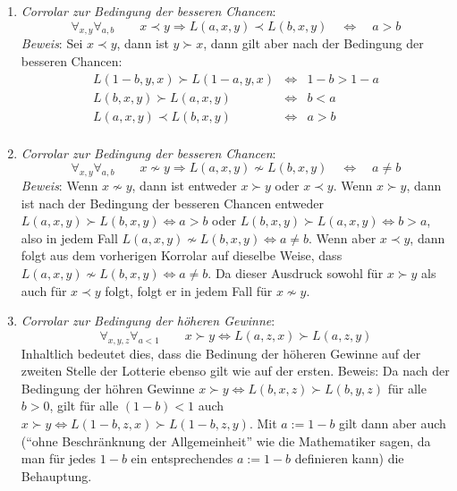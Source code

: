 \begin{enumerate}
  \item {\em Corrolar zur Bedingung der besseren Chancen}: 
  \[\forall_{x,y}\forall_{a,b} \qquad x \prec y \Rightarrow 
    L(a,x,y) \prec L(b,x,y) \quad \Leftrightarrow \quad a > b
  \]
  {\em Beweis}: Sei $x \prec y$, dann ist $y \succ x$, dann gilt aber nach der
  Bedingung der besseren Chancen:
  \begin{eqnarray*}
  L(1-b,y,x) \succ L(1-a,y,x) & \Leftrightarrow & 1-b > 1-a \\
  L(b,x,y) \succ L(a,x,y) & \Leftrightarrow & b < a \\
  L(a,x,y) \prec L(b,x,y) & \Leftrightarrow & a > b \\
  \end{eqnarray*}
  
  \item {\em Corrolar zur Bedingung der besseren Chancen}:
  \[\forall_{x,y}\forall_{a,b} \qquad x \not\sim y \Rightarrow
    L(a,x,y) \not\sim L(b,x,y) \quad \Leftrightarrow \quad a \not= b
  \] 
  {\em Beweis}: Wenn $x \not\sim y$, dann ist entweder $x \succ y$ oder
  $x \prec y$. Wenn $x \succ y$, dann ist nach der Bedingung der besseren
  Chancen entweder $L(a, x, y) \succ L(b, x, y) \Leftrightarrow a > b$
  oder $L(b, x, y) \succ L(a, x, y) \Leftrightarrow b > a$, also in jedem Fall
  $ L(a,x,y) \not\sim L(b,x,y) \Leftrightarrow a \not= b$. Wenn aber $x \prec
  y$, dann folgt aus dem vorherigen Korrolar auf dieselbe Weise, dass
  $ L(a,x,y) \not\sim L(b,x,y) \Leftrightarrow a \not= b$. Da dieser Ausdruck
  sowohl für $x \succ y$ als auch für $x \prec y$ folgt, folgt er in jedem Fall
  für $x \not\sim y$.
 
  \item {\em Corrolar zur Bedingung der höheren Gewinne}:
  \[\forall_{x,y,z}\forall_{a<1} \qquad 
  x \succ y \Leftrightarrow L(a, z, x) \succ L(a, z, y) \]
  Inhaltlich bedeutet dies, dass die Bedinung der höheren Gewinne auf der
  zweiten Stelle der Lotterie ebenso gilt wie auf der ersten.
  Beweis: Da nach der Bedingung der höhren Gewinne $x \succ y
  \Leftrightarrow L(b, x, z) \succ L(b, y, z)$ für alle $b>0$, gilt für alle 
  $(1-b) < 1$ auch $x \succ y \Leftrightarrow L(1-b,z,x) \succ L(1-b,z,y)$. 
  Mit $a := 1-b$ gilt dann aber auch ("`ohne Beschränknung der Allgemeinheit"'
  wie die Mathematiker sagen, da man für jedes $1-b$ ein entsprechendes
  $a := 1-b$ definieren kann) die Behauptung.  
  

\end{enumerate}
